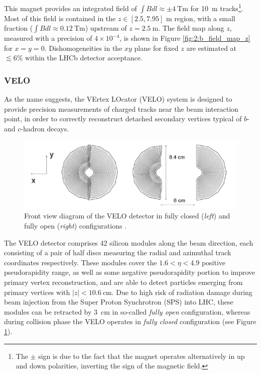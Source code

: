 This magnet provides an integrated field of $\int B dl \approx \pm \SI{4}{\tesla\meter}$ for \SI{10}{\meter} tracks\footnote{The $\pm$ sign is due to the fact that the magnet operates alternatively in up and down polarities, inverting the sign of the magnetic field.}.
Most of this field is contained in the $z\in[2.5,7.95]$ \si{\meter} region, with 
a small fraction ($\int B dl \approx \SI{0.12}{\tesla\meter}$) upstream of $z=\SI{2.5}{\meter}$. The field map along $z$, measured with a precision of $4 \times {10}^{-4}$, is shown in Figure \ref{fig:2:b_field_map_z} for $x=y=0$.
Dishomogeneities in the $xy$ plane for fixed $z$ are estimated at $\lesssim 6\%$ within the LHCb detector acceptance.

\subsubsection{VELO}
As the name suggests, the VErtex LOcator (VELO) system \cite{Barbosa-Marinho:504321} is designed to provide precision measurements of charged tracks near the beam interaction point, in order to correctly reconstruct detached secondary vertices typical of $b$- and $c$-hadron decays.

\begin{figure}[t]
	\centering
	\includegraphics[width=\textwidth]{graphics/02-lhcb/VELO_xy.png}
	\caption[Front view diagram of the VELO detector.]{Front view diagram of the VELO detector in fully closed (\textit{left}) and fully open (\textit{right}) configurations \cite{Barbosa-Marinho:504321}.}
	\label{fig:2:VELO_xy}
\end{figure}

The VELO detector comprises 42 silicon modules along the beam direction, each consisting of a pair of half discs measuring the radial and azimuthal track coordinates respectively. These modules cover the $1.6 < \eta < 4.9$ positive pseudorapidity range, as well as some negative pseudorapidity portion to improve primary vertex reconstruction, and are able to detect particles emerging from primary vertices with $|z| < \SI{10.6}{\centi\meter}$.
Due to high risk of radiation damage during beam injection from the Super Proton Synchrotron (SPS) into LHC, these modules can be retracted by \SI{3}{\centi\meter} in so-called \textit{fully open} configuration, whereas during collision phase the VELO operates in \textit{fully closed} configuration (see Figure \ref{fig:2:VELO_xy}).

